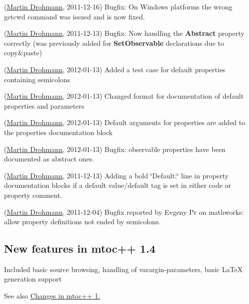 \begin{DoxyRefList}
(\hyperlink{developers_md}{Martin Drohmann}, 2011-\/12-\/16) Bugfix\+: On Windows platforms the wrong {\ttfamily getcwd} command was issued and is now fixed.

(\hyperlink{developers_md}{Martin Drohmann}, 2011-\/12-\/13) Bugfix\+: Now handling the {\bfseries Abstract} property correctly (was previously added for {\bfseries Set\+Observable} declarations due to copy\&paste)

(\hyperlink{developers_md}{Martin Drohmann}, 2012-\/01-\/13) Added a test case for default properties containing semicolons

(\hyperlink{developers_md}{Martin Drohmann}, 2012-\/01-\/13) Changed format for documentation of default properties and parameters

(\hyperlink{developers_md}{Martin Drohmann}, 2012-\/01-\/13) Default arguments for properties are added to the properties documentation block

(\hyperlink{developers_md}{Martin Drohmann}, 2012-\/01-\/13) Bugfix\+: observable properties have been documented as abstract ones.

(\hyperlink{developers_md}{Martin Drohmann}, 2011-\/12-\/13) Adding a bold \char`\"{}\+Default\+:\char`\"{} line in property documentation blocks if a default value/default tag is set in either code or property comment.

(\hyperlink{developers_md}{Martin Drohmann}, 2011-\/12-\/04) Bugfix reported by Evgeny Pr on mathworks\+: allow property definitions not ended by semicolons.
\end{DoxyRefList}\hypertarget{newfeat1_4}{}\subsection{New features in mtoc++ 1.4}\label{newfeat1_4}
Included basic source browsing, handling of varargin-\/parameters, basic La\+Te\+X generation support

See also \hyperlink{changelog1_4}{Changes in mtoc++ 1.}


